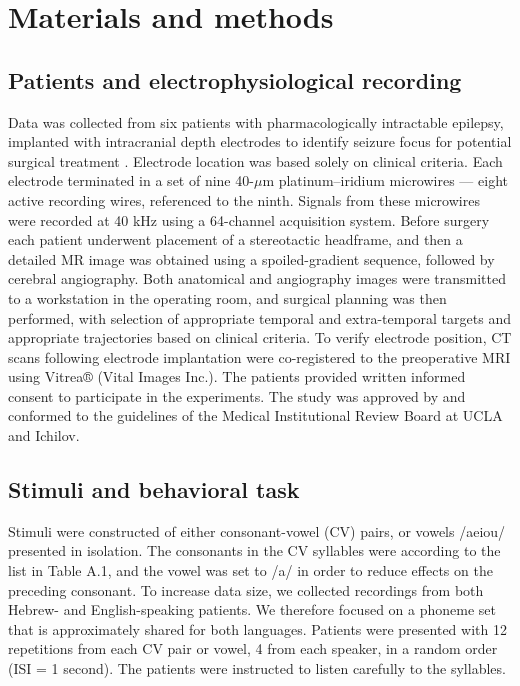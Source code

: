 \section{Materials and methods}
\subsection{Patients and electrophysiological recording}
Data was collected from six patients with pharmacologically intractable epilepsy, implanted with intracranial depth electrodes to identify seizure focus for potential surgical treatment \citep{mukamel2012human}. Electrode location was based solely on clinical criteria. Each electrode terminated in a set of nine 40-$\mu$m platinum–iridium microwires \citep{fried1999cerebral} — eight active recording wires, referenced to the ninth. Signals from these microwires were recorded at 40 kHz using a 64-channel acquisition system. Before surgery each patient underwent placement of a stereotactic headframe, and then a detailed MR image was obtained using a spoiled-gradient sequence, followed by cerebral angiography. Both anatomical and angiography images were transmitted to a workstation in the operating room, and surgical planning was then performed, with selection of appropriate temporal and extra-temporal targets and appropriate trajectories based on clinical criteria. To verify electrode position, CT scans following electrode implantation were co-registered to the preoperative MRI using Vitrea® (Vital Images Inc.). The patients provided written informed consent to participate in the experiments. The study was approved by and conformed to the guidelines of the Medical Institutional Review Board at UCLA and Ichilov.

\subsection{Stimuli and behavioral task}
Stimuli were constructed of either consonant-vowel (CV) pairs, or vowels /aeiou/ presented in isolation. The consonants in the CV syllables were according to the list in Table A.1, and the vowel was set to /a/ in order to reduce effects on the preceding consonant. To increase data size, we collected recordings from both Hebrew- and English-speaking patients. We therefore focused on a phoneme set that is approximately shared for both languages. Patients  were presented with 12 repetitions from each CV pair or vowel, 4 from each speaker, in a random order (ISI = 1 second). The patients were instructed to listen carefully to the syllables.

